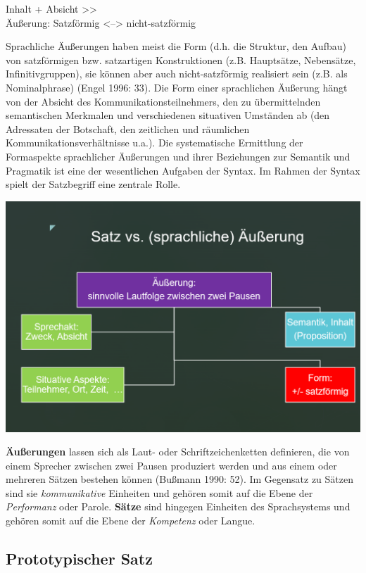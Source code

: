 \documentclass[
  letterpaper,
  DIV=11,
  numbers=noendperiod]{scrreprt}
\begin{document}
Inhalt + Absicht \textgreater\textgreater{}\\
Äußerung: Satzförmig \textless--\textgreater{} nicht-satzförmig

Sprachliche Äußerungen haben meist die Form (d.h. die Struktur, den
Aufbau) von satzförmigen bzw. satzartigen Konstruktionen (z.B.
Hauptsätze, Nebensätze, Infinitivgruppen), sie können aber auch
nicht-satzförmig realisiert sein (z.B. als Nominalphrase) (Engel 1996:
33). Die Form einer sprachlichen Äußerung hängt von der Absicht des
Kommunikationsteilnehmers, den zu übermittelnden semantischen Merkmalen
und verschiedenen situativen Umständen ab (den Adressaten der Botschaft,
den zeitlichen und räumlichen Kommunikationsverhältnisse u.a.). Die
systematische Ermittlung der Formaspekte sprachlicher Äußerungen und
ihrer Beziehungen zur Semantik und Pragmatik ist eine der wesentlichen
Aufgaben der Syntax. Im Rahmen der Syntax spielt der Satzbegriff eine
zentrale Rolle.

\includegraphics[width=1\textwidth,height=\textheight]{./pictures/aeusserung_vs_satz.png}

\textbf{Äußerungen} lassen sich als Laut- oder Schriftzeichenketten
definieren, die von einem Sprecher zwischen zwei Pausen produziert
werden und aus einem oder mehreren Sätzen bestehen können (Bußmann 1990:
52). Im Gegensatz zu Sätzen sind sie \emph{kommunikative} Einheiten und
gehören somit auf die Ebene der \emph{Performanz} oder Parole.
\textbf{Sätze} sind hingegen Einheiten des Sprachsystems und gehören
somit auf die Ebene der \emph{Kompetenz} oder Langue.

\hypertarget{prototypischer-satz}{%
\subsection{Prototypischer Satz}\label{prototypischer-satz}}
\end{document}
